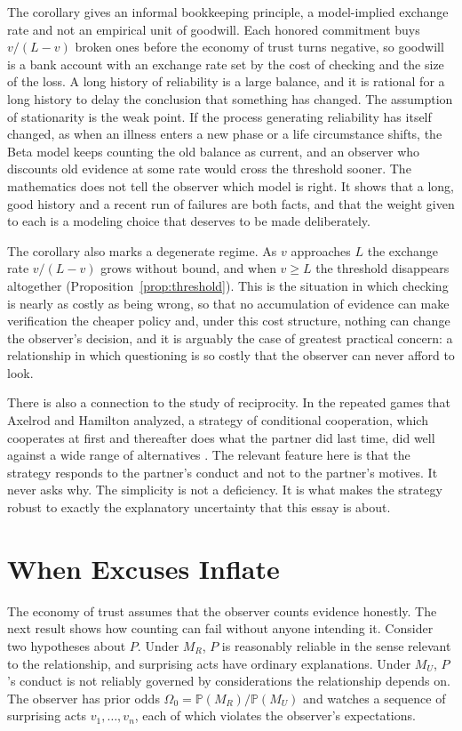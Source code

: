 \documentclass[11pt]{article}
\theoremstyle{definition}
\theoremstyle{remark}
\renewcommand{\Pr}{\mathbb{P}}
\begin{document}
The corollary gives an informal bookkeeping principle, a model-implied exchange rate and not an empirical unit of goodwill. Each honored commitment buys $v/(L-v)$ broken ones before the economy of trust turns negative, so goodwill is a bank account with an exchange rate set by the cost of checking and the size of the loss. A long history of reliability is a large balance, and it is rational for a long history to delay the conclusion that something has changed. The assumption of stationarity is the weak point. If the process generating reliability has itself changed, as when an illness enters a new phase or a life circumstance shifts, the Beta model keeps counting the old balance as current, and an observer who discounts old evidence at some rate would cross the threshold sooner. The mathematics does not tell the observer which model is right. It shows that a long, good history and a recent run of failures are both facts, and that the weight given to each is a modeling choice that deserves to be made deliberately.

The corollary also marks a degenerate regime. As $v$ approaches $L$ the exchange rate $v/(L-v)$ grows without bound, and when $v\ge L$ the threshold disappears altogether (Proposition~\ref{prop:threshold}). This is the situation in which checking is nearly as costly as being wrong, so that no accumulation of evidence can make verification the cheaper policy and, under this cost structure, nothing can change the observer's decision, and it is arguably the case of greatest practical concern: a relationship in which questioning is so costly that the observer can never afford to look.

There is also a connection to the study of reciprocity. In the repeated games that Axelrod and Hamilton analyzed, a strategy of conditional cooperation, which cooperates at first and thereafter does what the partner did last time, did well against a wide range of alternatives \citep{axelrod1981}. The relevant feature here is that the strategy responds to the partner's conduct and not to the partner's motives. It never asks why. The simplicity is not a deficiency. It is what makes the strategy robust to exactly the explanatory uncertainty that this essay is about.

\section{When Excuses Inflate}\label{sec:excuses}

The economy of trust assumes that the observer counts evidence honestly. The next result shows how counting can fail without anyone intending it. Consider two hypotheses about $P$. Under $M_R$, $P$ is reasonably reliable in the sense relevant to the relationship, and surprising acts have ordinary explanations. Under $M_U$, $P$'s conduct is not reliably governed by considerations the relationship depends on. The observer has prior odds $\Omega_0=\Pr(M_R)/\Pr(M_U)$ and watches a sequence of surprising acts $v_1,\dots,v_n$, each of which violates the observer's expectations.
\end{document}
